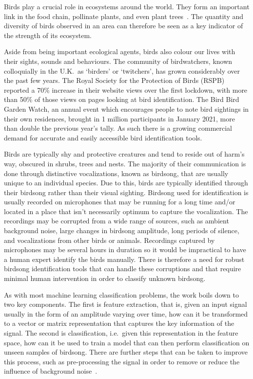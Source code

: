Birds play a crucial role in ecosystems around the world. They form an important
link in the food chain, pollinate plants, and even plant
trees~\cite{broughton2021long}. The quantity and diversity of birds observed in
an area can therefore be seen as a key indicator of the strength of its
ecosystem.

Aside from being important ecological agents, birds also colour our lives with
their sights, sounds and behaviours. The community of birdwatchers, known
colloquially in the U.K.~as `birders' or `twitchers', has grown considerably
over the past few years. The Royal Society for the Protection of Birds (RSPB)
reported a 70\% increase in their website views over the first lockdown, with
more than 50\% of those views on pages looking at bird identification. The Bird
Bird Garden Watch, an annual event which encourages people to note bird
sightings in their own residences, brought in 1 million participants in January
2021, more than double the previous year's tally. As such there is a growing
commercial demand for accurate and easily accessible bird identification tools.

Birds are typically shy and protective creatures and tend to reside out of
harm's way, obscured in shrubs, trees and nests. The majority of their
communication is done through distinctive vocalizations, known as birdsong, that
are usually unique to an individual species. Due to this, birds are typically
identified through their birdsong rather than their visual sighting. Birdsong
used for identification is usually recorded on microphones that may be running
for a long time and/or located in a place that isn't necessarily optimum to
capture the vocalization. The recordings may be corrupted from a wide range of
sources, such as ambient background noise, large changes in birdsong amplitude,
long periods of silence, and vocalizations from other birds or animals.
Recordings captured by microphones may be several hours in duration so it would
be impractical to have a human expert identify the birds manually. There is
therefore a need for robust birdsong identification tools that can handle these
corruptions and that require minimal human intervention in order to classify
unknown birdsong.

As with most machine learning classification problems, the work boils down to
two key components. The first is feature extraction, that is, given an input
signal usually in the form of an amplitude varying over time, how can it be
transformed to a vector or matrix representation that captures the key
information of the signal. The second is classification, i.e.~given this
representation in the feature space, how can it be used to train a model that
can then perform classification on unseen samples of birdsong. There are further
steps that can be taken to improve this process, such as pre-processing the
signal in order to remove or reduce the influence of background
noise~\cite{potamitis2014automatic}.


